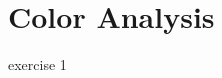 \documentclass[../Head/Main.tex]{subfiles}
\begin{document}
\section{Color Analysis}
exercise 1
\end{document}

